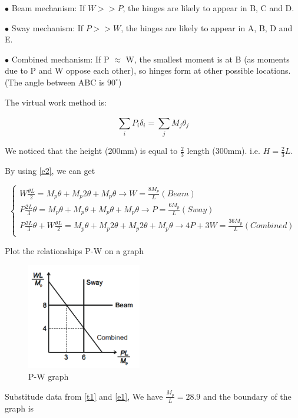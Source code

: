 $\bullet$ Beam mechanism: If $W>>P$, the hinges are likely to appear in B, C and D.



$\bullet$ Sway mechanism: If $P>>W$, the hinges are likely to appear in A, B, D and E.




$\bullet$ Combined mechanism: If P $\approx$ W, the smallest moment
is at B (as moments due to P
and W oppose each other), so
hinges form at other possible
locations. (The angle between ABC is $90^\circ$)

The virtual work method is: 

\begin{equation}
    \sum_i^{}{P_i\delta_i}=\sum_j^{}{M_j\theta_j}
    \label{e2}
\end{equation}

We noticed that the height (200mm) is equal to $\frac{2}{3}$ length (300mm). i.e. $H=\frac{2}{3}L$.

By using \autoref{e2}, we can get

$$
\left\{ \begin{array}{l}
	W\frac{\theta L}{2}=M_p\theta+M_p2\theta+M_p\theta \rightarrow W=\frac{8M_p}{L} (Beam)\\
	P\frac{2L}{3}\theta=M_p\theta+M_p\theta+M_p\theta+M_p\theta \rightarrow P=\frac{6M_p}{L} (Sway)\\
	P\frac{2L}{3}\theta+W\frac{\theta L}{2}=M_p\theta+M_p2\theta+M_p2\theta+M_p\theta \rightarrow 4P+3W=\frac{36M_p}{L} (Combined)\\
\end{array} \right. 
$$

Plot the relationships P-W on a graph

\begin{figure}[htbp]
    \centering
    \includegraphics[width=5cm]{./fig/14.png}
    \caption{P-W graph}
    \label{f3}
\end{figure}

Substitude data from \autoref{t1} and \autoref{e1}, We have $\frac{M_p}{L}=28.9$ and the boundary of the graph is 

